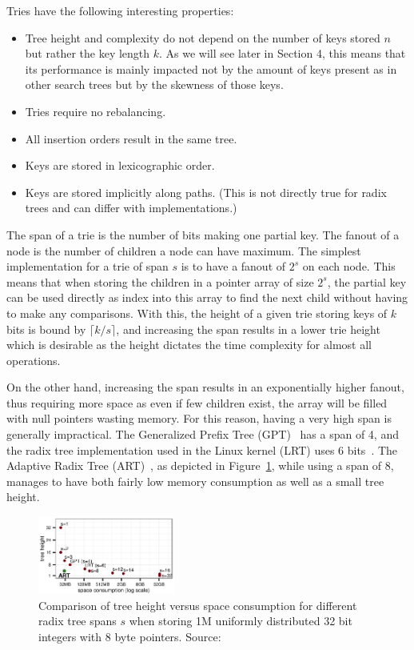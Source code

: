 \documentclass[acmtog, nonacm]{acmart}
\begin{document}
Tries have the following interesting properties:
\begin{itemize}
    \item Tree height and complexity do not depend on the number of keys stored $n$ but rather
    the key length $k$. As we will see later in Section 4, this means that its performance is mainly impacted not by
    the amount of keys present as in other search trees but by the skewness of those keys.
    \item Tries require no rebalancing.
    \item All insertion orders result in the same tree.
    \item Keys are stored in lexicographic order.
    \item Keys are stored implicitly along paths. (This is not directly true for radix trees and can differ with implementations.)
\end{itemize}

The span of a trie is the number of bits making one partial key. The fanout of a node is the number of children 
a node can have maximum. The simplest implementation for a trie of span $s$ is to have a fanout of $2^s$ on 
each node. This means that when storing the children in a pointer array of size $2^s$, the partial key can be used 
directly as index into this array to find the next child without having to make any comparisons.
With this, the height of a given trie storing keys of $k$ bits is bound by $\lceil k/s\rceil$, and increasing 
the span results in a lower trie height which is desirable as the height dictates the time complexity for almost 
all operations.

On the other hand, increasing the span results in an exponentially higher fanout, thus requiring more space as even 
if few children exist, the array will be filled with null pointers wasting memory. 
For this reason, having a very high span is generally impractical. The Generalized Prefix Tree (GPT)~\cite{mci/Boehm2011} 
has a span of 4, and the radix tree implementation used in the Linux kernel (LRT) uses 6 bits~\cite{corbet2006lrt}. 
The Adaptive Radix Tree (ART)~\cite{6544812}, as depicted in Figure~\ref{fig:trie-mem}, while using a span of 8, manages to have both 
fairly low memory consumption as well as a small tree height.

\begin{figure}
    \centering
    \includegraphics[width=0.4\textwidth]{images/02-trie-memory-consumption.png}
    \caption{Comparison of tree height versus space consumption for different radix tree spans $s$ when storing 1M uniformly distributed 32 bit integers with 8 byte pointers.
    Source:~\cite{6544812}}
    \label{fig:trie-mem}
\end{figure}
\end{document}
